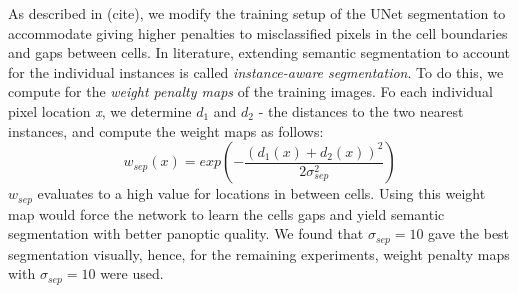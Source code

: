 \documentclass[journal]{IEEEtran}
\begin{document}
As described in (cite), we modify the training setup of the UNet segmentation to accommodate giving higher penalties to misclassified pixels in the cell boundaries and gaps between cells. In literature, extending semantic segmentation to account for the individual instances is called \textit{instance-aware segmentation}. To do this, we compute for the \textit{weight penalty maps} of the training images.
Fo each individual pixel location \textit{x}, we determine \textit{$d_1$} and \textit{$d_2$} - the distances to the two nearest instances, and compute the weight maps as follows:
\begin{equation}
w_{sep}(x) = exp\left({-\frac{(d_1(x) + d_2(x))^2}{2\sigma^2_{sep}}}\right)
\end{equation}
$w_{sep}$ evaluates to a high value for locations in between  cells. Using this weight map would force the network to learn the cells gaps and yield semantic segmentation with better panoptic quality. We found that $\sigma_{sep} = 10$ gave the best segmentation visually, hence, for the remaining experiments, weight penalty maps with $\sigma_{sep} = 10$ were used. 
\end{document}
